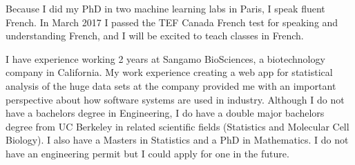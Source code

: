 \documentclass{article}
\begin{document}
Because I did my PhD in two machine learning labs in Paris, I speak
fluent French. In March 2017 I passed the TEF Canada French test for
speaking and understanding French, and I will be excited to teach
classes in French. 

I have experience working 2 years at Sangamo BioSciences, a
biotechnology company in California. My work experience creating a web
app for statistical analysis of the huge data sets at the company
provided me with an important perspective about how software systems
are used in industry. Although I do not have a bachelors degree in
Engineering, I do have a double major bachelors degree from UC
Berkeley in related scientific fields (Statistics and Molecular Cell
Biology). I also have a Masters in Statistics and a PhD in
Mathematics. I do not have an engineering permit but I could apply for
one in the future.


\end{document}
